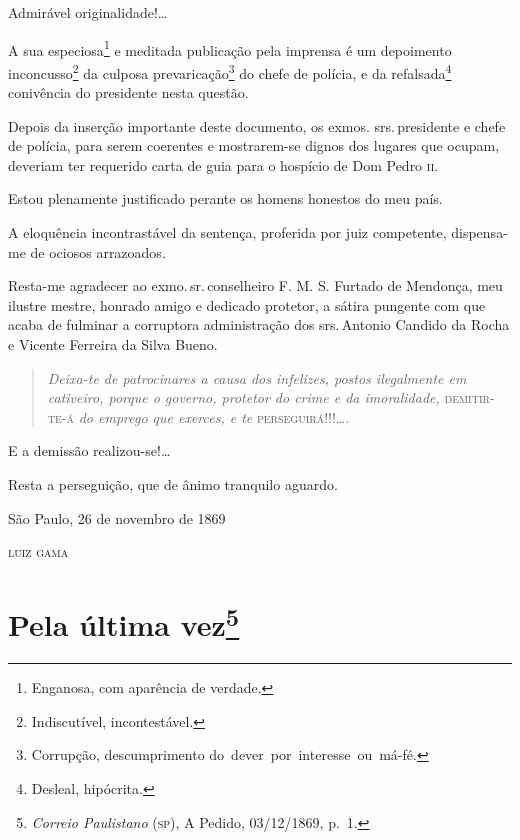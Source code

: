 Admirável originalidade!\ldots{}

A sua especiosa\footnote{Enganosa, com aparência de verdade.} e
meditada publicação pela imprensa é um depoimento inconcusso\footnote{
  Indiscutível, incontestável.} da culposa prevaricação\footnote{
  Corrupção, descumprimento do~dever~por~interesse~ou~má-fé.} do chefe
de polícia, e da refalsada\footnote{Desleal, hipócrita.} conivência do
presidente nesta questão.

Depois da inserção importante deste documento, os exmos. srs.\,presidente
e chefe de polícia, para serem coerentes e mostrarem-se dignos dos
lugares que ocupam, deveriam ter requerido carta de guia para o hospício
de Dom Pedro \textsc{ii}.

Estou plenamente justificado perante os homens honestos do meu país.

A eloquência incontrastável da sentença, proferida por juiz competente,
dispensa-me de ociosos arrazoados.

Resta-me agradecer ao exmo.\,sr.\,conselheiro F. M. S. Furtado de
Mendonça, meu ilustre mestre, honrado amigo e dedicado protetor, a
sátira pungente com que acaba de fulminar a corruptora administração dos
srs.\,Antonio Candido da Rocha e Vicente Ferreira da Silva Bueno.

\begin{quote}
\emph{Deixa-te de patrocinares a causa dos infelizes, postos
ilegalmente em cativeiro, porque o governo, protetor do crime e da
imoralidade,} \textsc{demitir-te-á} \emph{do emprego que exerces, e te}
\textsc{perseguirá}!!!\ldots{}.
\end{quote}

E a demissão realizou-se!\ldots{}

Resta a perseguição, que de ânimo tranquilo aguardo.

\begin{flushright}
São Paulo, 26 de novembro de 1869

\textsc{luiz gama}
\end{flushright}

\chapter{Pela última vez\footnote{\emph{Correio Paulistano} (\textsc{sp}), A
  Pedido, 03/12/1869, p.~1.}}


